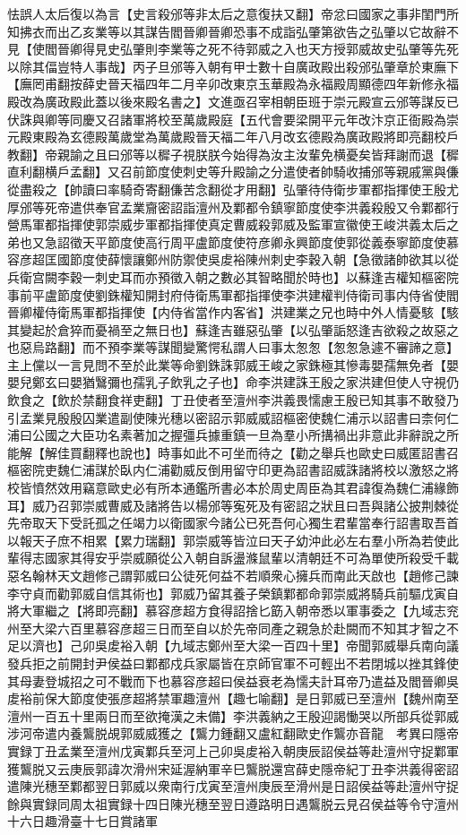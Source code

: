 怯誤人太后復以為言【史言殺邠等非太后之意復扶又翻】帝忿曰國家之事非閨門所知拂衣而出乙亥業等以其謀告閻晉卿晉卿恐事不成詣弘肇第欲告之弘肇以它故辭不見【使閻晉卿得見史弘肇則李業等之死不待郭威之入也天方授郭威故史弘肇等先死以除其偪豈特人事哉】丙子旦邠等入朝有甲士數十自廣政殿出殺邠弘肇章於東廡下【廡罔甫翻按薛史晉天福四年二月辛卯改東京玉華殿為永福殿周顯德四年新修永福殿改為廣政殿此蓋以後來殿名書之】文進亟召宰相朝臣班于崇元殿宣云邠等謀反已伏誅與卿等同慶又召諸軍將校至萬歲殿庭【五代會要梁開平元年改汴京正衙殿為崇元殿東殿為玄德殿萬歲堂為萬歲殿晉天福二年八月改玄德殿為廣政殿將即亮翻校戶教翻】帝親諭之且曰邠等以穉子視朕朕今始得為汝主汝輩免横憂矣皆拜謝而退【穉直利翻横戶孟翻】又召前節度使刺史等升殿諭之分遣使者帥騎收捕邠等親戚黨與傔從盡殺之【帥讀曰率騎奇寄翻傔苦念翻從才用翻】弘肇待侍衛步軍都指揮使王殷尤厚邠等死帝遣供奉官孟業齎密詔詣澶州及鄴都令鎮寧節度使李洪義殺殷又令鄴都行營馬軍都指揮使郭崇威步軍都指揮使真定曹威殺郭威及監軍宣徽使王峻洪義太后之弟也又急詔徵天平節度使高行周平盧節度使符彦卿永興節度使郭從義泰寧節度使慕容彦超匡國節度使薛懷讓鄭州防禦使吳䖍裕陳州刺史李穀入朝【急徵諸帥欲其以從兵衛宫闕李穀一刺史耳而亦預徵入朝之數必其智略聞於時也】以蘇逢吉權知樞密院事前平盧節度使劉銖權知開封府侍衛馬軍都指揮使李洪建權判侍衛司事内侍省使閻晉卿權侍衛馬軍都指揮使【内侍省當作内客省】洪建業之兄也時中外人情憂駭【駭其變起於倉猝而憂禍至之無日也】蘇逢吉雖惡弘肇【以弘肇詬怒逢吉欲殺之故惡之也惡烏路翻】而不預李業等謀聞變驚愕私謂人曰事太怱怱【怱怱急遽不審諦之意】主上儻以一言見問不至於此業等命劉銖誅郭威王峻之家銖極其慘毒嬰孺無免者【嬰嬰兒鄭玄曰嬰猶鷖彌也孺乳子飲乳之子也】命李洪建誅王殷之家洪建但使人守視仍飲食之【飲於禁翻食祥吏翻】丁丑使者至澶州李洪義畏懦慮王殷已知其事不敢發乃引孟業見殷殷囚業遣副使陳光穗以密詔示郭威威詔樞密使魏仁浦示以詔書曰柰何仁浦曰公國之大臣功名素著加之握彊兵據重鎮一旦為羣小所搆禍出非意此非辭說之所能解【解佳買翻釋也說也】時事如此不可坐而待之【勸之舉兵也歐史曰威匿詔書召樞密院吏魏仁浦謀於臥内仁浦勸威反倒用留守印更為詔書詔威誅諸將校以激怒之將校皆憤然效用竊意歐史必有所本通鑑所書必本於周史周臣為其君諱復為魏仁浦緣飾耳】威乃召郭崇威曹威及諸將告以楊邠等寃死及有密詔之狀且曰吾與諸公披荆棘從先帝取天下受託孤之任竭力以衛國家今諸公已死吾何心獨生君輩當奉行詔書取吾首以報天子庶不相累【累力瑞翻】郭崇威等皆泣曰天子幼沖此必左右羣小所為若使此輩得志國家其得安乎崇威願從公入朝自訴盪滌鼠輩以清朝廷不可為單使所殺受千載惡名翰林天文趙修己謂郭威曰公徒死何益不若順衆心擁兵而南此天啟也【趙修己諫李守貞而勸郭威自信其術也】郭威乃留其養子榮鎮鄴都命郭崇威將騎兵前驅戊寅自將大軍繼之【將即亮翻】慕容彦超方食得詔捨匕筯入朝帝悉以軍事委之【九域志兖州至大梁六百里慕容彦超三日而至自以於先帝同產之親急於赴闕而不知其才智之不足以濟也】己卯吳䖍裕入朝【九域志鄭州至大梁一百四十里】帝聞郭威舉兵南向議發兵拒之前開封尹侯益曰鄴都戍兵家屬皆在京師官軍不可輕出不若閉城以挫其鋒使其母妻登城招之可不戰而下也慕容彦超曰侯益衰老為懦夫計耳帝乃遣益及閻晉卿吳䖍裕前保大節度使張彦超將禁軍趣澶州【趣七喻翻】是日郭威已至澶州【魏州南至澶州一百五十里兩日而至欲掩漢之未備】李洪義納之王殷迎謁慟哭以所部兵從郭威涉河帝遣内養鸗脱覘郭威威獲之【鸗力鍾翻又盧紅翻歐史作鸗亦音龍　考異曰隱帝實録丁丑孟業至澶州戊寅鄴兵至河上己卯吳䖍裕入朝庚辰詔侯益等赴澶州守捉鄴軍獲鸗脱又云庚辰郭諱次滑州宋延渥納軍辛巳鸗脱還宫薛史隱帝紀丁丑李洪義得密詔遣陳光穗至鄴都翌日郭威以衆南行戊寅至澶州庚辰至滑州是日詔侯益等赴澶州守捉餘與實録同周太祖實録十四日陳光穗至翌日遵路明日遇鸗脱云見召侯益等令守澶州十六日趣滑臺十七日賞諸軍